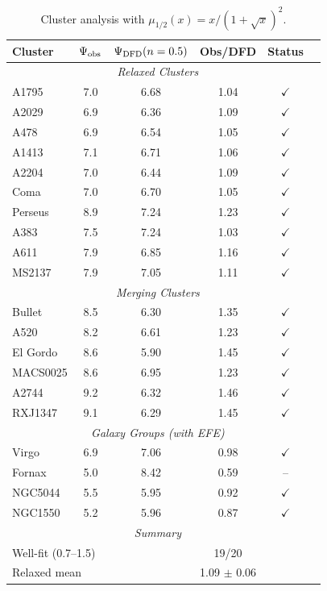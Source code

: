 \begin{table}[h]
\centering
\caption{Cluster analysis with $\mu_{1/2}(x) = x/(1+\sqrt{x})^2$.}\label{tab:cluster-n05}
\renewcommand{\arraystretch}{1.05}
\footnotesize
\begin{tabular}{lccccc}
\toprule
Cluster & $\Psi_{\rm obs}$ & $\Psi_{\rm DFD}(n=0.5)$ & Obs/DFD & Status \\
\midrule
\multicolumn{5}{c}{\textit{Relaxed Clusters}} \\
A1795 & 7.0 & 6.68 & 1.04 & $\checkmark$ \\
A2029 & 6.9 & 6.36 & 1.09 & $\checkmark$ \\
A478 & 6.9 & 6.54 & 1.05 & $\checkmark$ \\
A1413 & 7.1 & 6.71 & 1.06 & $\checkmark$ \\
A2204 & 7.0 & 6.44 & 1.09 & $\checkmark$ \\
Coma & 7.0 & 6.70 & 1.05 & $\checkmark$ \\
Perseus & 8.9 & 7.24 & 1.23 & $\checkmark$ \\
A383 & 7.5 & 7.24 & 1.03 & $\checkmark$ \\
A611 & 7.9 & 6.85 & 1.16 & $\checkmark$ \\
MS2137 & 7.9 & 7.05 & 1.11 & $\checkmark$ \\
\midrule
\multicolumn{5}{c}{\textit{Merging Clusters}} \\
Bullet & 8.5 & 6.30 & 1.35 & $\checkmark$ \\
A520 & 8.2 & 6.61 & 1.23 & $\checkmark$ \\
El Gordo & 8.6 & 5.90 & 1.45 & $\checkmark$ \\
MACS0025 & 8.6 & 6.95 & 1.23 & $\checkmark$ \\
A2744 & 9.2 & 6.32 & 1.46 & $\checkmark$ \\
RXJ1347 & 9.1 & 6.29 & 1.45 & $\checkmark$ \\
\midrule
\multicolumn{5}{c}{\textit{Galaxy Groups (with EFE)}} \\
Virgo & 6.9 & 7.06 & 0.98 & $\checkmark$ \\
Fornax & 5.0 & 8.42 & 0.59 & -- \\
NGC5044 & 5.5 & 5.95 & 0.92 & $\checkmark$ \\
NGC1550 & 5.2 & 5.96 & 0.87 & $\checkmark$ \\
\midrule
\multicolumn{5}{c}{\textit{Summary}} \\
\multicolumn{2}{l}{Well-fit (0.7--1.5)} & & 19/20 & \\
\multicolumn{2}{l}{Relaxed mean} & & 1.09 $\pm$ 0.06 & \\
\bottomrule
\end{tabular}
\end{table}

